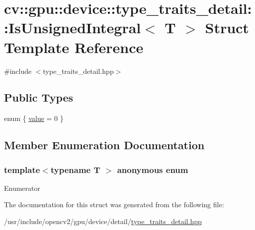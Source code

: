 \hypertarget{structcv_1_1gpu_1_1device_1_1type__traits__detail_1_1IsUnsignedIntegral}{\section{cv\-:\-:gpu\-:\-:device\-:\-:type\-\_\-traits\-\_\-detail\-:\-:Is\-Unsigned\-Integral$<$ T $>$ Struct Template Reference}
\label{structcv_1_1gpu_1_1device_1_1type__traits__detail_1_1IsUnsignedIntegral}
}


{\ttfamily \#include $<$type\-\_\-traits\-\_\-detail.\-hpp$>$}

\subsection*{Public Types}
\begin{DoxyCompactItemize}
\item 
enum \{ \hyperlink{structcv_1_1gpu_1_1device_1_1type__traits__detail_1_1IsUnsignedIntegral_a75b158ff0e18b3dfcc477a9c3ffcea4eaef8e894027e784861e36694a62646175}{value} = 0
 \}
\end{DoxyCompactItemize}


\subsection{Member Enumeration Documentation}
\hypertarget{structcv_1_1gpu_1_1device_1_1type__traits__detail_1_1IsUnsignedIntegral_a75b158ff0e18b3dfcc477a9c3ffcea4e}{\subsubsection[{anonymous enum}]{\setlength{\rightskip}{0pt plus 5cm}template$<$typename T $>$ anonymous enum}}\label{structcv_1_1gpu_1_1device_1_1type__traits__detail_1_1IsUnsignedIntegral_a75b158ff0e18b3dfcc477a9c3ffcea4e}
\begin{Desc}
\item[Enumerator]\par
\begin{description}
\item[{\em 
\hypertarget{structcv_1_1gpu_1_1device_1_1type__traits__detail_1_1IsUnsignedIntegral_a75b158ff0e18b3dfcc477a9c3ffcea4eaef8e894027e784861e36694a62646175}{value}\label{structcv_1_1gpu_1_1device_1_1type__traits__detail_1_1IsUnsignedIntegral_a75b158ff0e18b3dfcc477a9c3ffcea4eaef8e894027e784861e36694a62646175}
}]\end{description}
\end{Desc}


The documentation for this struct was generated from the following file\-:\begin{DoxyCompactItemize}
\item 
/usr/include/opencv2/gpu/device/detail/\hyperlink{type__traits__detail_8hpp}{type\-\_\-traits\-\_\-detail.\-hpp}\end{DoxyCompactItemize}
